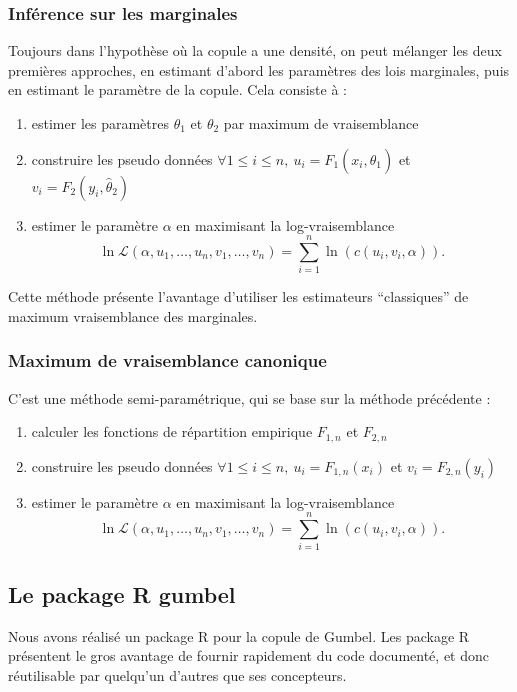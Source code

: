\documentclass[11pt,a4paper]{article}
\newcommand{\pkg}{\textbf}
\newcommand{\soft}{\textsf}
\begin{document}
\subsubsection{Inf\'erence sur les marginales}
Toujours dans l'hypoth\`ese o\`u la copule a une densit\'e, on peut m\'elanger les deux premi\`eres approches, en estimant d'abord les param\`etres
des lois marginales, puis en estimant le param\`etre de la copule. Cela consiste \`a :
\begin{enumerate}
\item estimer les param\`etres $\theta_1$ et $\theta_2$ par maximum de vraisemblance
\item construire les pseudo donn\'ees $\forall 1\leq i \leq n, ~u_i = F_1(x_i, \hat \theta_1)$ et $v_i = F_2(y_i, \hat \theta_2)$
\item estimer le param\`etre $\alpha$ en maximisant la log-vraisemblance 
$$\ln \mathcal L(\alpha, u_1,\dots, u_n, v_1,\dots, v_n) = \sum_{i=1}^n \ln\left( c \left( u_i, v_i,\alpha \right)\right).$$
\end{enumerate}
Cette m\'ethode pr\'esente l'avantage d'utiliser les estimateurs ``classiques'' de maximum vraisemblance des marginales.

\subsubsection{Maximum de vraisemblance canonique}
C'est une m\'ethode semi-param\'etrique, qui se base sur la m\'ethode pr\'ec\'edente :
\begin{enumerate}
\item calculer les fonctions de r\'epartition empirique $F_{1,n}$ et $F_{2,n}$
\item construire les pseudo donn\'ees $\forall 1\leq i \leq n, ~u_i = F_{1,n}(x_i)$ et $v_i = F_{2,n}(y_i)$
\item estimer le param\`etre $\alpha$ en maximisant la log-vraisemblance 
$$\ln \mathcal L(\alpha, u_1,\dots, u_n, v_1,\dots, v_n) = \sum_{i=1}^n \ln\left( c \left( u_i, v_i,\alpha \right)\right).$$
\end{enumerate}

\subsection{Le package \soft{R} \pkg{gumbel}}
Nous avons r\'ealis\'e un package \soft{R} pour la copule de Gumbel. Les package \soft{R} pr\'esentent le gros avantage
de fournir rapidement du code document\'e, et donc r\'eutilisable par quelqu'un d'autres que ses concepteurs.
\end{document}
